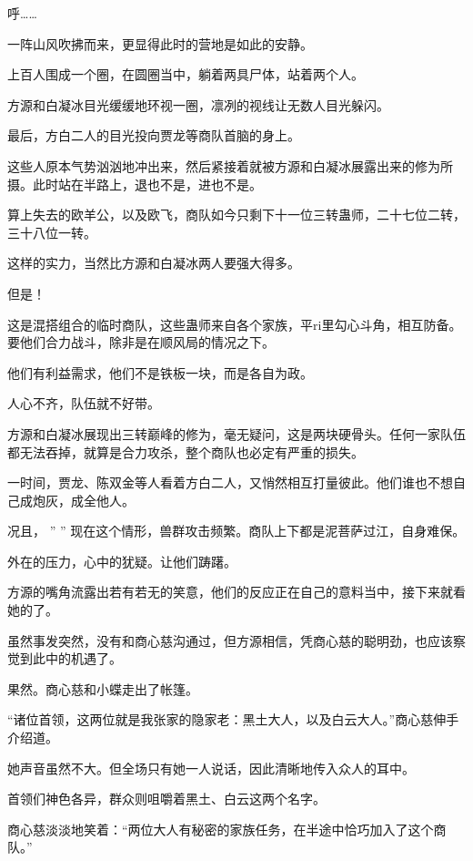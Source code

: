 
\begin{this_body}

呼……

一阵山风吹拂而来，更显得此时的营地是如此的安静。

上百人围成一个圈，在圆圈当中，躺着两具尸体，站着两个人。

方源和白凝冰目光缓缓地环视一圈，凛冽的视线让无数人目光躲闪。

最后，方白二人的目光投向贾龙等商队首脑的身上。

这些人原本气势汹汹地冲出来，然后紧接着就被方源和白凝冰展露出来的修为所摄。此时站在半路上，退也不是，进也不是。

算上失去的欧羊公，以及欧飞，商队如今只剩下十一位三转蛊师，二十七位二转，三十八位一转。

这样的实力，当然比方源和白凝冰两人要强大得多。

但是！

这是混搭组合的临时商队，这些蛊师来自各个家族，平ri里勾心斗角，相互防备。要他们合力战斗，除非是在顺风局的情况之下。

他们有利益需求，他们不是铁板一块，而是各自为政。

人心不齐，队伍就不好带。

方源和白凝冰展现出三转巅峰的修为，毫无疑问，这是两块硬骨头。任何一家队伍都无法吞掉，就算是合力攻杀，整个商队也必定有严重的损失。

一时间，贾龙、陈双金等人看着方白二人，又悄然相互打量彼此。他们谁也不想自己成炮灰，成全他人。

况且， ” ” 现在这个情形，兽群攻击频繁。商队上下都是泥菩萨过江，自身难保。

外在的压力，心中的犹疑。让他们踌躇。

方源的嘴角流露出若有若无的笑意，他们的反应正在自己的意料当中，接下来就看她的了。

虽然事发突然，没有和商心慈沟通过，但方源相信，凭商心慈的聪明劲，也应该察觉到此中的机遇了。

果然。商心慈和小蝶走出了帐篷。

“诸位首领，这两位就是我张家的隐家老：黑土大人，以及白云大人。”商心慈伸手介绍道。

她声音虽然不大。但全场只有她一人说话，因此清晰地传入众人的耳中。

首领们神色各异，群众则咀嚼着黑土、白云这两个名字。

商心慈淡淡地笑着：“两位大人有秘密的家族任务，在半途中恰巧加入了这个商队。”


\end{this_body}
